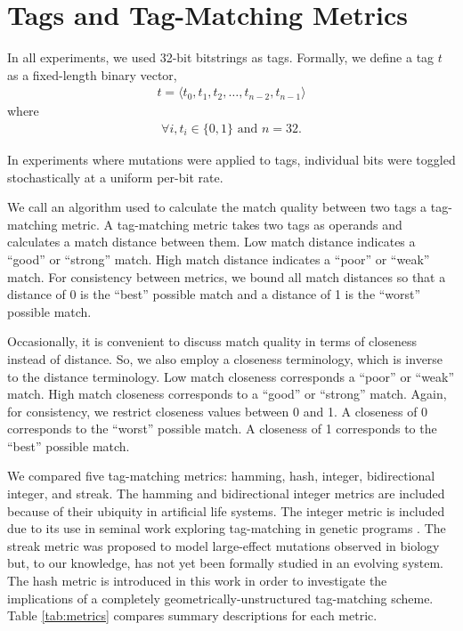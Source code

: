 \section{Tags and Tag-Matching Metrics}



In all experiments, we used 32-bit bitstrings as tags.
Formally, we define a tag $t$ as a fixed-length binary vector,
\begin{align*}
t = \langle t_0, t_1, t_2, \dots, t_{n-2}, t_{n-1} \rangle
\end{align*}
where
\begin{align*}
\forall i, t_i \in \{0, 1\} \text{ and } n=32.
\end{align*}

In experiments where mutations were applied to tags, individual bits were toggled stochastically at a uniform per-bit rate.

We call an algorithm used to calculate the match quality between two tags a tag-matching metric.
A tag-matching metric takes two tags as operands and calculates a match distance between them.
Low match distance indicates a ``good'' or ``strong'' match.
High match distance indicates a ``poor'' or ``weak'' match.
For consistency between metrics, we bound all match distances so that a distance of 0 is the ``best'' possible match and a distance of 1 is the ``worst'' possible match.

Occasionally, it is convenient to discuss match quality in terms of closeness instead of distance.
So, we also employ a closeness terminology, which is inverse to the distance terminology.
Low match closeness corresponds a ``poor'' or ``weak'' match.
High match closeness corresponds to a ``good'' or ``strong'' match.
Again, for consistency, we restrict closeness values between 0 and 1.
A closeness of 0 corresponds to the ``worst'' possible match.
A closeness of 1 corresponds to the ``best'' possible match.

We compared five tag-matching metrics: hamming, hash, integer, bidirectional integer, and streak.
The hamming and bidirectional integer metrics are included because of their ubiquity in artificial life systems.
The integer metric is included due to its use in seminal work exploring tag-matching in genetic programs \citep{spector2011tag, spector2011s,spector2012tag}.
The streak metric was proposed to model large-effect mutations observed in biology but, to our knowledge, has not yet been formally studied in an evolving system.
The hash metric is introduced in this work in order to investigate the implications of a completely geometrically-unstructured tag-matching scheme.
Table \ref{tab:metrics} compares summary descriptions for each metric.

